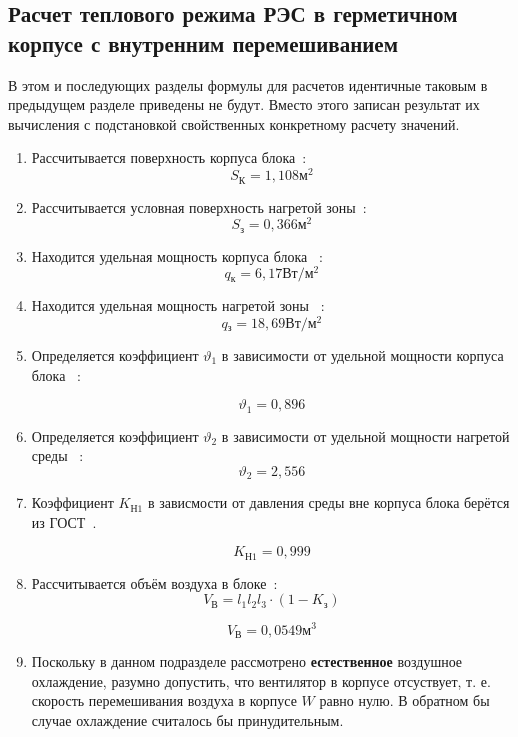 \subsection{Расчет теплового режима РЭС в герметичном корпусе с внутренним перемешиванием}

В этом и последующих разделы формулы для расчетов идентичные таковым в
предыдущем разделе приведены не будут. Вместо этого записан результат
их вычисления с подстановкой свойственных конкретному расчету
значений.

\begin{enumerate}[label={\arabic*.}]
\item Рассчитывается поверхность корпуса блока~\cite{Rotkop1976}: %
  $$S\mathrm{_{К}}=1,108\mathrm{м^2}$$
\item Рассчитывается условная поверхность нагретой зоны~\cite{Rotkop1976}: %
  $$S\mathrm{_{з}} = 0,366\mathrm{м^2}$$ 
\item Находится удельная мощность корпуса блока ~\cite{Rotkop1976}:  %
  $$q\mathrm{_к} = 6,17\mathrm{Вт/м^2}$$
\item Находится удельная мощность нагретой зоны ~\cite{Rotkop1976}: %
  $$q\mathrm{_з} = 18,69 \mathrm{ Вт/м^2}$$

\item Определяется коэффициент $\vartheta_1$ в зависимости от удельной мощности корпуса блока ~\cite{Rotkop1976}:

  $$\vartheta_1=0,896$$
\item Определяется коэффициент $\vartheta_2$ в зависимости от удельной мощности нагретой среды ~\cite{Rotkop1976}:
  $$\vartheta_2=2,556$$

  \item Коэффициент $K\mathrm{_{Н1}}$ в зависмости от давления
  среды вне корпуса блока берётся из ГОСТ~\cite{GOST_15150-69}.

  $$K\mathrm{_{Н1}} = 0,999$$
\item Рассчитывается объём воздуха в блоке~\cite{Rotkop1976}:
  \begin{equation}
    V\mathrm{_{В}} = l_1 l_2 l_3 \cdot (1 - K\mathrm{_з})
  \end{equation}

  $$V\mathrm{_{В}} = 0,0549\mathrm{м^3}$$

\item Поскольку в данном подразделе
    рассмотрено \textbf{естественное} воздушное охлаждение,
    разумно допустить, что вентилятор в корпусе отсуствует, т. е.
    скорость перемешивания воздуха в корпусе $W$ равно нулю.
    В обратном бы случае охлаждение считалось бы принудительным.


\end{enumerate}
